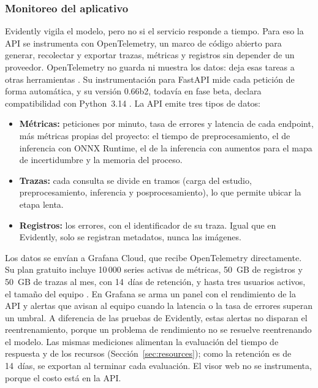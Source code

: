 \subsubsection{Monitoreo del aplicativo}\label{sec:app-monitoring}
Evidently vigila el modelo, pero no si el servicio responde a tiempo. Para eso
la API se instrumenta con OpenTelemetry, un marco de código abierto para
generar, recolectar y exportar trazas, métricas y registros sin depender de un
proveedor. OpenTelemetry no guarda ni muestra los datos: deja esas tareas a
otras herramientas \parencite{opentelemetry}. Su instrumentación para FastAPI
mide cada petición de forma automática, y su versión 0.66b2, todavía en
fase beta, declara compatibilidad con Python~3.14 \parencite{otelfastapi}. La
API emite tres tipos de datos:

\begin{itemize}
    \item \textbf{Métricas:} peticiones por minuto, tasa de errores y latencia
          de cada endpoint, más métricas propias del proyecto: el tiempo de
          preprocesamiento, el de inferencia con ONNX Runtime, el de la
          inferencia con aumentos para el mapa de incertidumbre y la memoria
          del proceso.
    \item \textbf{Trazas:} cada consulta se divide en tramos (carga del
          estudio, preprocesamiento, inferencia y posprocesamiento), lo que
          permite ubicar la etapa lenta.
    \item \textbf{Registros:} los errores, con el identificador de su traza.
          Igual que en Evidently, solo se registran metadatos, nunca las
          imágenes.
\end{itemize}

Los datos se envían a Grafana Cloud, que recibe OpenTelemetry directamente. Su
plan gratuito incluye 10\,000 series activas de métricas, 50~GB de registros y
50~GB de trazas al mes, con 14~días de retención, y hasta tres usuarios
activos, el tamaño del equipo \parencite{grafanapricing}. En Grafana se arma un
panel con el rendimiento de la API y alertas que avisan al equipo cuando la
latencia o la tasa de errores superan un umbral. A diferencia de las pruebas de
Evidently, estas alertas no disparan el reentrenamiento, porque un problema de
rendimiento no se resuelve reentrenando el modelo. Las mismas mediciones
alimentan la evaluación del tiempo de respuesta y de los recursos
(Sección~\ref{sec:resources}); como la retención es de 14~días, se exportan al
terminar cada evaluación. El visor web no se instrumenta, porque el costo
está en la API.

